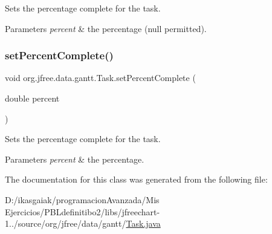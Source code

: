 Sets the percentage complete for the task.


\begin{DoxyParams}{Parameters}
{\em percent} & the percentage ({\ttfamily null} permitted). \\
\hline
\end{DoxyParams}
\mbox{\label{classorg_1_1jfree_1_1data_1_1gantt_1_1_task_a91c50a4358774392ab6e7313f699d553}} 
\subsubsection{\texorpdfstring{set\+Percent\+Complete()}{setPercentComplete()}\hspace{0.1cm}{\footnotesize\ttfamily [2/2]}}
{\footnotesize\ttfamily void org.\+jfree.\+data.\+gantt.\+Task.\+set\+Percent\+Complete (\begin{DoxyParamCaption}\item[{double}]{percent }\end{DoxyParamCaption})}

Sets the percentage complete for the task.


\begin{DoxyParams}{Parameters}
{\em percent} & the percentage. \\
\hline
\end{DoxyParams}


The documentation for this class was generated from the following file\+:\begin{DoxyCompactItemize}
\item 
D\+:/ikasgaiak/programacion\+Avanzada/\+Mis Ejercicios/\+P\+B\+Ldefinitibo2/libs/jfreechart-\/1../source/org/jfree/data/gantt/\mbox{\hyperlink{_task_8java}{Task.\+java}}\end{DoxyCompactItemize}

